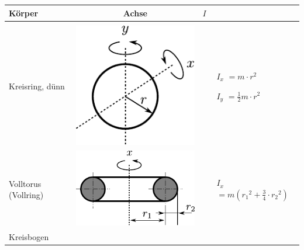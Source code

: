 \begin{table}[h!]
\centering
\begin{tabular}{m{2cm} c m{}}
Körper        & Achse        & $I$ \\
\hline
& & \\
Kreisring, dünn &
        \begin{minipage}{0.3\textwidth}
        \centering
        \includegraphics[scale=\traegscale]{traeg/traeg-kreisring-duenn.pdf}
        \end{minipage} &
                \begin{itemize}
                \item[$I_x$]$= m \cdot r^2$
                \item[$I_y$]$= \frac12 m\cdot r^2$
                \end{itemize} \\
Volltorus (Vollring) &
        \begin{minipage}{0.3\textwidth}
        \centering
        \includegraphics[scale=\traegscale]{traeg/traeg-kreisring.pdf}
        \end{minipage} &
                \begin{itemize}
                        \item[$I_x$]$= m \left({r_1}^2 + \frac{3}{4}
                                \cdot {r_2}^2\right)$
                \end{itemize} \\
Kreisbogen &
        \begin{minipage}{0.3\textwidth}

\end{minipage}
\end{tabular}
\end{table}
